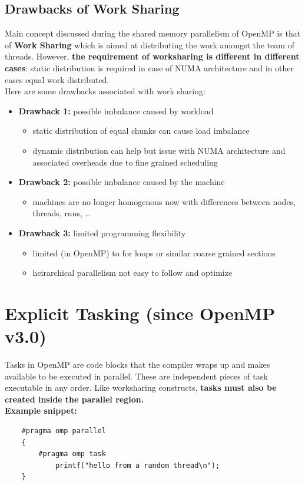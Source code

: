\documentclass[12pt, a4paper]{report}
\begin{document}
\subsection{Drawbacks of Work Sharing}
Main concept discussed during the shared memory parallelism of OpenMP is that of {\bfseries{Work Sharing}} which is aimed at distributing the work amongst the
team of threads. However, {\bfseries{the requirement of worksharing is different in different cases}}: static distribution is required in case of NUMA architecture
and in other cases equal work distributed.\\
Here are some drawbacks associated with work sharing:
\begin{itemize}
    \item {\bfseries{Drawback 1:}} possible imbalance caused by workload
    \begin{itemize}
        \item static distribution of equal chunks can cause load imbalance
        \item dynamic distribution can help but issue with NUMA architecture and associated overheads due to fine grained scheduling
    \end{itemize}
    \item {\bfseries{Drawback 2:}} possible imbalance caused by the machine
    \begin{itemize}
        \item machines are no longer homogenous now with differences between nodes, threads, runs, \dots
    \end{itemize}
    \item {\bfseries{Drawback 3:}} limited programming flexibility
    \begin{itemize}
        \item limited (in OpenMP) to for loops or similar coarse grained sections
        \item heirarchical parallelism not easy to follow and optimize
    \end{itemize}
\end{itemize}

\section{Explicit Tasking {\small{(since OpenMP v3.0)}}}
Tasks in OpenMP are code blocks that the compiler wraps up and makes available to be executed in parallel. These are independent pieces of task executable in
any order. Like worksharing constructs, {\bfseries{tasks must also be created inside the parallel region.}}\\
{\bfseries{Example snippet:}}
\begin{verbatim}
    #pragma omp parallel
    {
        #pragma omp task
            printf("hello from a random thread\n");
    }
\end{verbatim}
\end{document}
